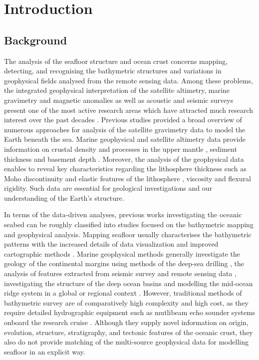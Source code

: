 \documentclass[geomatics,article,submit,pdftex,moreauthors]{Definitions/mdpi}
\begin{document}
\section{Introduction}

\subsection{Background}
The analysis of the seafloor structure and ocean crust concerns mapping, detecting, and recognising the bathymetric structures and variations in geophysical fields analysed from the remote sensing data. Among these problems, the integrated geophysical interpretation of the satellite altimetry, marine gravimetry and magnetic anomalies as well as acoustic and seismic surveys present one of the most active research areas which have attracted much research interest over the past decades \cite{Bascou}. Previous studies \cite{ESHAGH2021313} provided a broad overview of numerous approaches for analysis of the satellite gravimetry data to model the Earth beneath the sea. Marine geophysical and satellite altimetry data provide information on crustal density and processes in the upper mantle \cite{KAPAWAR2021106692,PENG2022110823,ZHANG202368}, sediment thickness and basement depth \cite{Lemenkova202005}. Moreover, the analysis of the geophysical data enables to reveal key characteristics regarding the lithosphere thickness such as Moho discontinuity and elastic features of the lithosphere \cite{TESAURO201378}, viscosity and flexural rigidity. Such data are essential for geological investigations and our understanding of the Earth's structure.

In terms of the data-driven analyses, previous works investigating the oceanic seabed can be roughly classified into studies focused on the bathymetric mapping and geophysical analysis. Mapping seafloor usually characterises the bathymetric patterns with the increased details of data visualization and improved cartographic methods \cite{Battista,Lemenkova202105,Lemenkova202012}. Marine geophysical methods generally investigate the geology of the continental margins using methods of the deep-sea drilling \cite{Schlich1992TheGA,Veevers1991a}, the analysis of features extracted from seismic survey and remote sensing data \cite{NEGI2022229330}, investigating the structure of the deep ocean basins \cite{BENARD2010633,RAMANA2001241,DAVIS201616} and modelling the mid-ocean ridge system in a global or regional context \cite{FREY200073,Sreejith,Lemenkova202112}. However, traditional methods of bathymetric survey are of comparatively high complexity and high cost, as they require detailed hydrographic equipment such as mutlibeam echo sounder systems onboard the research cruise \cite{Falvey}. Although they supply novel information on origin, evolution, structure, stratigraphy, and tectonic features of the oceanic crust, they also do not provide matching of the multi-source geophysical data for modelling seafloor in an explicit way. 
\end{document}
